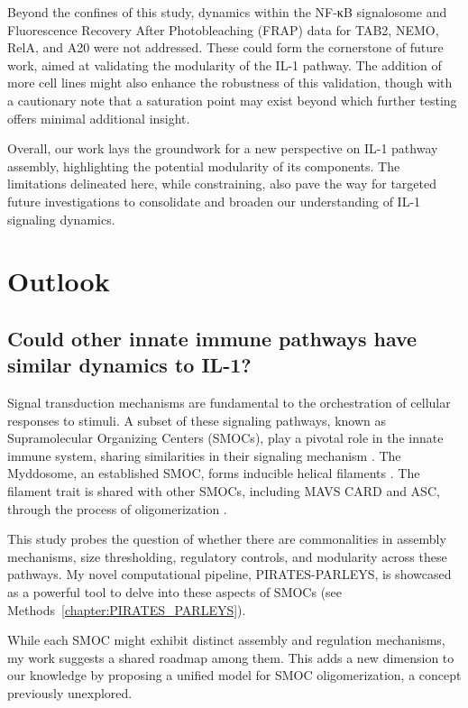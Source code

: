 Beyond the confines of this study, dynamics within the NF-κB signalosome and Fluorescence Recovery After Photobleaching (FRAP) data for TAB2, NEMO, RelA, and A20 were not addressed. These could form the cornerstone of future work, aimed at validating the modularity of the IL-1 pathway. The addition of more cell lines might also enhance the robustness of this validation, though with a cautionary note that a saturation point may exist beyond which further testing offers minimal additional insight.

Overall, our work lays the groundwork for a new perspective on IL-1 pathway assembly, highlighting the potential modularity of its components. The limitations delineated here, while constraining, also pave the way for targeted future investigations to consolidate and broaden our understanding of IL-1 signaling dynamics.

\chapter{Outlook}
\section{Could other innate immune pathways have similar dynamics to IL-1?}
Signal transduction mechanisms are fundamental to the orchestration of cellular responses to stimuli. A subset of these signaling pathways, known as Supramolecular Organizing Centers (SMOCs), play a pivotal role in the innate immune system, sharing similarities in their signaling mechanism \autocite{Kagan_2014}. The Myddosome, an established SMOC, forms inducible helical filaments \autocite{Moncrieffe_2020}. The filament trait is shared with other SMOCs, including MAVS CARD and ASC, through the process of oligomerization \autocite{Xu_2014}\autocite{Nambayan_2019}.

This study probes the question of whether there are commonalities in assembly mechanisms, size thresholding, regulatory controls, and modularity across these pathways. My novel computational pipeline, PIRATES-PARLEYS, is showcased as a powerful tool to delve into these aspects of SMOCs (see Methods~\ref{chapter:PIRATES_PARLEYS}).

While each SMOC might exhibit distinct assembly and regulation mechanisms, my work suggests a shared roadmap among them. This adds a new dimension to our knowledge by proposing a unified model for SMOC oligomerization, a concept previously unexplored.

